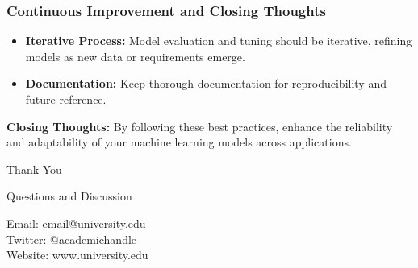 \documentclass[aspectratio=169]{beamer}
\begin{document}
\begin{frame}[fragile]
    \frametitle{Continuous Improvement and Closing Thoughts}
    \begin{itemize}
        \item \textbf{Iterative Process:} 
        Model evaluation and tuning should be iterative, refining models as new data or requirements emerge.

        \item \textbf{Documentation:} 
        Keep thorough documentation for reproducibility and future reference.
    \end{itemize}

    \textbf{Closing Thoughts:} By following these best practices, enhance the reliability and adaptability of your machine learning models across applications.
\end{frame}

\begin{frame}
    \begin{center}
        \vspace{1cm}
        {\Large Thank You}
        
        \vspace{0.5cm}
        {\large Questions and Discussion}
        
        \vspace{1.5cm}
        {\small
        Email: email@university.edu\\
        \vspace{0.2cm}
        Twitter: @academichandle\\
        Website: www.university.edu}
    \end{center}
\end{frame}
\end{document}
